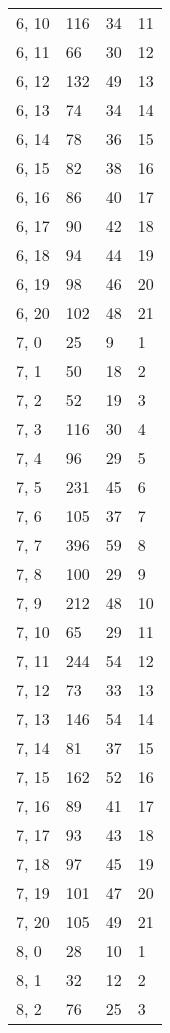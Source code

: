 \begin{table}
\begin{tabular}{llll}
6, 10  &     116 &   34 &    11 \\
6, 11  &      66 &   30 &    12 \\
6, 12  &     132 &   49 &    13 \\
6, 13  &      74 &   34 &    14 \\
6, 14  &      78 &   36 &    15 \\
6, 15  &      82 &   38 &    16 \\
6, 16  &      86 &   40 &    17 \\
6, 17  &      90 &   42 &    18 \\
6, 18  &      94 &   44 &    19 \\
6, 19  &      98 &   46 &    20 \\
6, 20  &     102 &   48 &    21 \\
7, 0   &      25 &    9 &     1 \\
7, 1   &      50 &   18 &     2 \\
7, 2   &      52 &   19 &     3 \\
7, 3   &     116 &   30 &     4 \\
7, 4   &      96 &   29 &     5 \\
7, 5   &     231 &   45 &     6 \\
7, 6   &     105 &   37 &     7 \\
7, 7   &     396 &   59 &     8 \\
7, 8   &     100 &   29 &     9 \\
7, 9   &     212 &   48 &    10 \\
7, 10  &      65 &   29 &    11 \\
7, 11  &     244 &   54 &    12 \\
7, 12  &      73 &   33 &    13 \\
7, 13  &     146 &   54 &    14 \\
7, 14  &      81 &   37 &    15 \\
7, 15  &     162 &   52 &    16 \\
7, 16  &      89 &   41 &    17 \\
7, 17  &      93 &   43 &    18 \\
7, 18  &      97 &   45 &    19 \\
7, 19  &     101 &   47 &    20 \\
7, 20  &     105 &   49 &    21 \\
8, 0   &      28 &   10 &     1 \\
8, 1   &      32 &   12 &     2 \\
8, 2   &      76 &   25 &     3 \\

\end{tabular}
\end{table}
